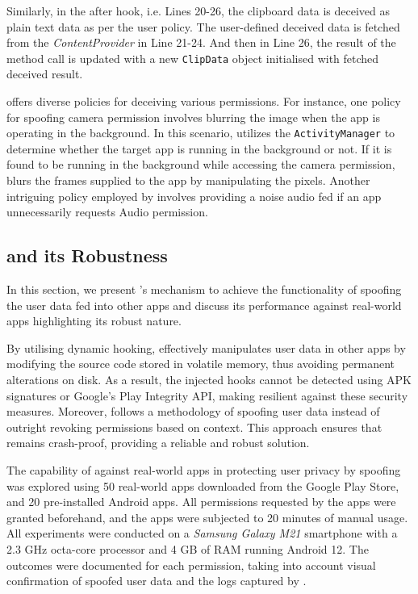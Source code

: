 Similarly, in the after hook, i.e. Lines 20-26, the clipboard data is deceived as plain text data as per the user policy. The user-defined deceived data is fetched from the \textit{ContentProvider} in Line 21-24. And then in Line 26, the result of the method call is updated with a new \texttt{ClipData} object initialised with fetched deceived result.

\framework{} offers diverse policies for deceiving various permissions. For instance, one policy for spoofing camera permission involves blurring the image when the app is operating in the background. In this scenario, \framework{} utilizes the \texttt{ActivityManager} to determine whether the target app is running in the background or not. If it is found to be running in the background while accessing the camera permission, \framework{} blurs the frames supplied to the app by manipulating the pixels. Another intriguing policy employed by \framework{} involves providing a noise audio fed if an app unnecessarily requests Audio permission.

\subsection{\framework{} and its Robustness}
In this section, we present \framework{}'s mechanism to achieve the functionality of spoofing the user data fed into other apps and discuss its performance against real-world apps highlighting its robust nature.

By utilising dynamic hooking, \framework{} effectively manipulates user data in other apps by modifying the source code stored in volatile memory, thus avoiding permanent alterations on disk. As a result, the injected hooks cannot be detected using APK signatures or Google's Play Integrity API, making \framework{} resilient against these security measures. Moreover, \framework{} follows a methodology of spoofing user data instead of outright revoking permissions based on context. This approach ensures that \framework{} remains crash-proof, providing a reliable and robust solution.

The capability of \framework{} against real-world apps in protecting user privacy by spoofing was explored using 50 real-world apps downloaded from the Google Play Store, and 20 pre-installed Android apps. All permissions requested by the apps were granted beforehand, and the apps were subjected to 20 minutes of manual usage. All experiments were conducted on a \textit{Samsung Galaxy M21} smartphone with a 2.3 GHz octa-core processor and 4 GB of RAM running Android 12. The outcomes were documented for each permission, taking into account visual confirmation of spoofed user data and the logs captured by \framework{}.

